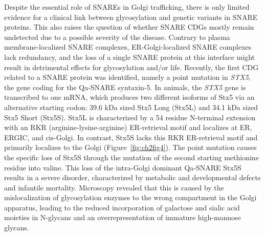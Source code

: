 Despite the essential role of SNAREs in Golgi trafficking\cite{linders_stx5-mediated_2019}, there is only limited evidence for a clinical link between glycosylation and genetic variants in SNARE proteins. This also raises the question of whether SNARE CDGs mostly remain undetected due to a possible severity of the disease. Contrary to plasma membrane-localized SNARE complexes, ER-Golgi-localized SNARE complexes lack redundancy, and the loss of a single SNARE protein at this interface might result in detrimental effects for glycosylation and/or life\cite{dingjan_endosomal_2018}. Recently, the first CDG related to a SNARE protein was identified, namely a point mutation in \emph{STX5}, the gene coding for the Qa-SNARE syntaxin-5\cite{linders_congenital_2020}. In animals, the \emph{STX5} gene is transcribed to one mRNA, which produces two different isoforms of Stx5 via an alternative starting codon: 39.6 kDa sized Stx5 Long (Stx5L) and 34.1 kDa sized Stx5 Short (Stx5S)\cite{linders_stx5-mediated_2019,hui_isoform_1997}. Stx5L is characterized by a 54 residue N-terminal extension with an RKR (arginine-lysine-arginine) ER-retrieval motif and localizes at ER, ERGIC, and cis-Golgi. In contrast, Stx5S lacks this RKR ER-retrieval motif and primarily localizes to the Golgi (Figure~\ref{fig:ch2fig4}). The point mutation causes the specific loss of Stx5S through the mutation of the second starting methionine residue into valine. This loss of the intra-Golgi dominant Qa-SNARE Stx5S results in a severe disorder, characterized by metabolic and developmental defects and infantile mortality. Microscopy revealed that this is caused by the mislocalization of glycosylation enzymes to the wrong compartment in the Golgi apparatus, leading to the reduced incorporation of galactose and sialic acid moieties in N-glycans and an overrepresentation of immature high-mannose glycans\cite{linders_congenital_2020}.

